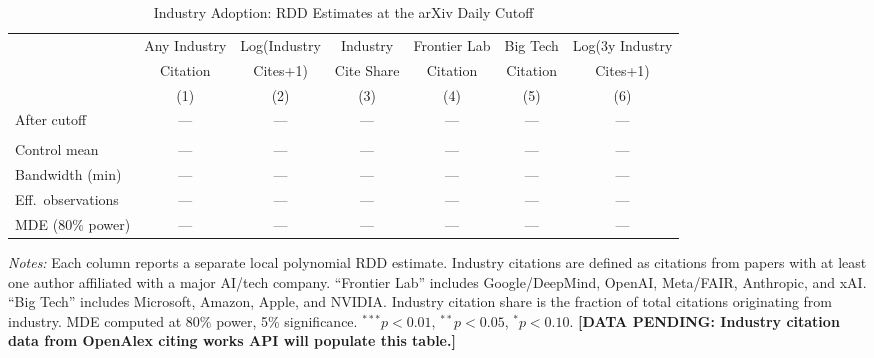 \begin{table}[htbp]
\centering
\caption{Industry Adoption: RDD Estimates at the arXiv Daily Cutoff}
\label{tab:industry}
\begin{adjustbox}{max width=\textwidth}
\begin{tabular}{lcccccc}
\hline\hline
& Any Industry & Log(Industry & Industry & Frontier Lab & Big Tech & Log(3y Industry \\
& Citation & Cites+1) & Cite Share & Citation & Citation & Cites+1) \\
& (1) & (2) & (3) & (4) & (5) & (6) \\
\hline
After cutoff & --- & --- & --- & --- & --- & --- \\
& & & & & & \\
\hline
Control mean & --- & --- & --- & --- & --- & --- \\
Bandwidth (min) & --- & --- & --- & --- & --- & --- \\
Eff.\ observations & --- & --- & --- & --- & --- & --- \\
MDE (80\% power) & --- & --- & --- & --- & --- & --- \\
\hline\hline
\end{tabular}
\end{adjustbox}
\begin{minipage}{0.95\textwidth}
\footnotesize
\textit{Notes:} Each column reports a separate local polynomial RDD estimate. Industry citations are defined as citations from papers with at least one author affiliated with a major AI/tech company. ``Frontier Lab'' includes Google/DeepMind, OpenAI, Meta/FAIR, Anthropic, and xAI. ``Big Tech'' includes Microsoft, Amazon, Apple, and NVIDIA. Industry citation share is the fraction of total citations originating from industry. MDE computed at 80\% power, 5\% significance. $^{***}p<0.01$, $^{**}p<0.05$, $^{*}p<0.10$. \textbf{[DATA PENDING: Industry citation data from OpenAlex citing works API will populate this table.]}
\end{minipage}
\end{table}
